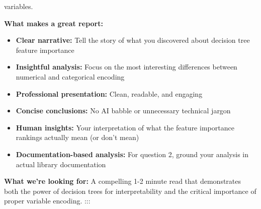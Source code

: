 \documentclass[
  letterpaper,
  DIV=11,
  numbers=noendperiod]{scrartcl}
\providecommand{\tightlist}{%
  \setlength{\itemsep}{0pt}\setlength{\parskip}{0pt}}
\begin{document}
{variables.}\label{r-and-python-differ-in-categorical-variable-handling-because-rs-rpart-package-supports-categorical-variables-and-has-an-algorithm-that-splits-directly-on-categorical-vairable-and-treates-it-as-a-single-feature-for-importance-calculation.-on-the-other-hand-pythons-scikit-learn-requires-all-input-data-to-be-numerical-and-must-use-one-hot-encoding-which-creates-seperaate-binary-columns-for-each-zip-code.-therefore-the-importance-is-spread-across-multiple-dummy-variables.-r-does-a-significantly-better-job-of-modeling-categorical-variables-because-r-creates-meaningful-splits-that-group-related-cateogries-together-but-python-creates-artificial-splits-on-individual-dummy-variables-that-are-harder-to-interpret.-we-can-see-in-feature-importance-that-python-dilutes-importance-across-multiple-dummy-variables-which-is-underestimating-the-true-importance.-r-maintains-reasonable-tree-complexity-with-logical-categorical-splits-whereas-python-creates-overly-complex-trees-with-many-splits-on-dummy-variables.-to-support-my-claim-i-will-provide-a-quote-from-the-documentation-of-the-sklearn.tree.decisiontreeregression-site.-the-quote-says-however-the-scikit-learn-implementation-does-not-support-categorical-variables-for-now.-this-explains-why-python-does-a-worse-job-of-modelling-categorical-variables.}

\textbf{What makes a great report:}

\begin{itemize}
\tightlist
\item
  \textbf{Clear narrative:} Tell the story of what you discovered about
  decision tree feature importance
\item
  \textbf{Insightful analysis:} Focus on the most interesting
  differences between numerical and categorical encoding
\item
  \textbf{Professional presentation:} Clean, readable, and engaging
\item
  \textbf{Concise conclusions:} No AI babble or unnecessary technical
  jargon
\item
  \textbf{Human insights:} Your interpretation of what the feature
  importance rankings actually mean (or don't mean)
\item
  \textbf{Documentation-based analysis:} For question 2, ground your
  analysis in actual library documentation
\end{itemize}

\textbf{What we're looking for:} A compelling 1-2 minute read that
demonstrates both the power of decision trees for interpretability and
the critical importance of proper variable encoding. :::
\end{document}
